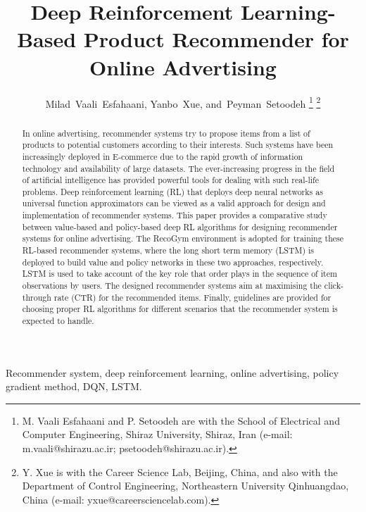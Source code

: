 \documentclass[journal]{IEEEtran}
\begin{document}
\title{Deep Reinforcement Learning-Based Product Recommender for Online Advertising}

\author{Milad~Vaali~Esfahaani, 
        Yanbo~Xue, 
        and~Peyman~Setoodeh
\thanks{M. Vaali Esfahaani and P. Setoodeh are with the School
of Electrical and Computer Engineering, Shiraz University, Shiraz,
Iran (e-mail: m.vaali@shirazu.ac.ir; psetoodeh@shirazu.ac.ir).}
\thanks{Y. Xue is with the Career Science Lab, Beijing, China, and also with the Department of Control Engineering, Northeastern University 
Qinhuangdao, China (e-mail: yxue@careersciencelab.com).}
}


\maketitle

\begin{abstract}
In online advertising, recommender systems try to propose items from a list of products to potential customers according to their interests. Such systems have been increasingly deployed in E-commerce due to the rapid growth of information technology and availability of large datasets. The ever-increasing progress in the field of artificial intelligence has provided powerful tools for dealing with such real-life problems. Deep reinforcement learning (RL) that deploys deep neural networks as universal function approximators can be viewed as a valid approach for design and implementation of recommender systems. This paper provides a comparative study between value-based and policy-based deep RL algorithms for designing recommender systems for online advertising. The RecoGym environment is adopted for training these RL-based recommender systems, where the long short term memory (LSTM) is deployed to build value and policy networks in these two approaches, respectively. LSTM is used to take account of the key role that order plays in the sequence of item observations by users. The designed recommender systems aim at maximising the click-through rate (CTR) for the recommended items. Finally, guidelines are provided for choosing proper RL algorithms for different scenarios that the recommender system is expected to handle. 
\end{abstract}

\begin{IEEEkeywords}
Recommender system, deep reinforcement learning, online advertising, policy gradient method, DQN, LSTM.
\end{IEEEkeywords}
\end{document}
